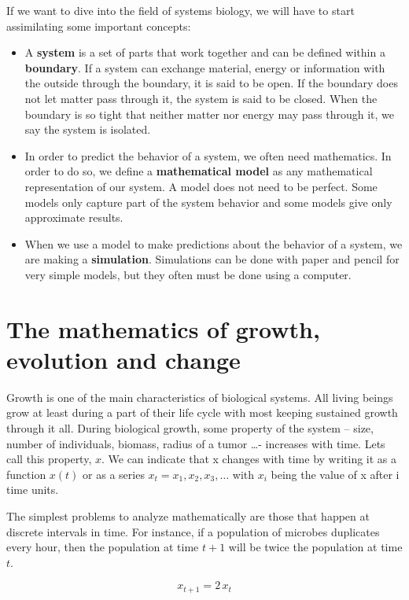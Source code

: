 \documentclass{tufte-book} %
\begin{document}
If we want to dive into the field of systems biology, we will have to start assimilating some important concepts: 
\begin{itemize}
	\item A \textbf{system} is a set of parts that work together and can be defined within a \textbf{boundary}. If a system can exchange material, energy or information with the outside through the boundary, it is said to be open. If the boundary does not let matter pass through it, the system is said to be closed. When the boundary is so tight that neither matter nor energy may pass through it, we say the system is isolated.
	\item In order to predict the behavior of a system, we often need mathematics. In order to do so, we define a \textbf{mathematical model} as any mathematical representation of our system. A model does not need to be perfect. Some models only capture part of the system behavior and some models give only  approximate results.
	\item When we use a model to make predictions about the behavior of a system, we are making a \textbf{simulation}. Simulations can be done with paper and pencil for very simple models, but they often must be done using a computer.
\end{itemize}

\section{The mathematics of growth, evolution and change}
Growth is one of the main characteristics of biological systems. All living beings grow at least during a part of their life cycle with most keeping sustained growth through it all. During biological growth, some property of the system -- size, number of individuals, biomass, radius of a tumor \dots - increases with time. Lets call this property, $x$. We can indicate that x changes with time by writing it as a function $x(t)$ or as a series $x_t = x_1, x_2, x_3,\dots$ with $x_i$ being the value of x after i time units.

The simplest problems to analyze mathematically are those that happen at discrete intervals in time. For instance, if a population of microbes duplicates every hour, then the population at time $t+1$ will be twice the population at time $t$.

\begin{equation}
	\label{geomgrowth_example}
	x_{t+1} = 2 \, x_t
\end{equation}
\end{document}
